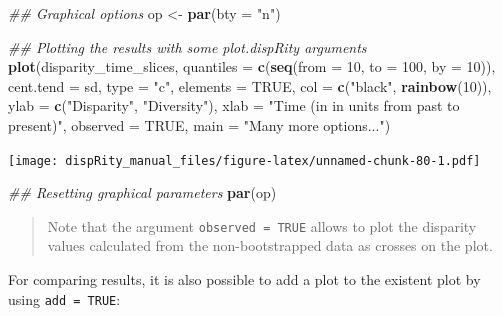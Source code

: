 \documentclass[
]{book}
\newenvironment{Shaded}{\begin{snugshade}}{\end{snugshade}}
\newcommand{\CommentTok}[1]{\textcolor[rgb]{0.56,0.35,0.01}{\textit{#1}}}
\newcommand{\DataTypeTok}[1]{\textcolor[rgb]{0.13,0.29,0.53}{#1}}
\newcommand{\DecValTok}[1]{\textcolor[rgb]{0.00,0.00,0.81}{#1}}
\newcommand{\KeywordTok}[1]{\textcolor[rgb]{0.13,0.29,0.53}{\textbf{#1}}}
\newcommand{\NormalTok}[1]{#1}
\newcommand{\OtherTok}[1]{\textcolor[rgb]{0.56,0.35,0.01}{#1}}
\newcommand{\StringTok}[1]{\textcolor[rgb]{0.31,0.60,0.02}{#1}}
\begin{document}
\begin{Shaded}
\begin{Highlighting}[]
\CommentTok{\#\# Graphical options}
\NormalTok{op \textless{}{-}}\StringTok{ }\KeywordTok{par}\NormalTok{(}\DataTypeTok{bty =} \StringTok{"n"}\NormalTok{)}

\CommentTok{\#\# Plotting the results with some plot.dispRity arguments}
\KeywordTok{plot}\NormalTok{(disparity\_time\_slices,}
    \DataTypeTok{quantiles =} \KeywordTok{c}\NormalTok{(}\KeywordTok{seq}\NormalTok{(}\DataTypeTok{from =} \DecValTok{10}\NormalTok{, }\DataTypeTok{to =} \DecValTok{100}\NormalTok{, }\DataTypeTok{by =} \DecValTok{10}\NormalTok{)),}
    \DataTypeTok{cent.tend =}\NormalTok{ sd, }\DataTypeTok{type =} \StringTok{"c"}\NormalTok{, }\DataTypeTok{elements =} \OtherTok{TRUE}\NormalTok{,}
    \DataTypeTok{col =} \KeywordTok{c}\NormalTok{(}\StringTok{"black"}\NormalTok{, }\KeywordTok{rainbow}\NormalTok{(}\DecValTok{10}\NormalTok{)),}
    \DataTypeTok{ylab =} \KeywordTok{c}\NormalTok{(}\StringTok{"Disparity"}\NormalTok{, }\StringTok{"Diversity"}\NormalTok{),}
    \DataTypeTok{xlab =} \StringTok{"Time (in in units from past to present)"}\NormalTok{,}
    \DataTypeTok{observed =} \OtherTok{TRUE}\NormalTok{,}
    \DataTypeTok{main =} \StringTok{"Many more options..."}\NormalTok{)}
\end{Highlighting}
\end{Shaded}

\texttt{[image: dispRity\_manual\_files/figure-latex/unnamed-chunk-80-1.pdf]}

\begin{Shaded}
\begin{Highlighting}[]
\CommentTok{\#\# Resetting graphical parameters}
\KeywordTok{par}\NormalTok{(op)}
\end{Highlighting}
\end{Shaded}

\begin{quote}
Note that the argument \texttt{observed\ =\ TRUE} allows to plot the disparity values calculated from the non-bootstrapped data as crosses on the plot.
\end{quote}

For comparing results, it is also possible to add a plot to the existent plot by using \texttt{add\ =\ TRUE}:
\end{document}
